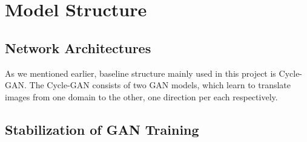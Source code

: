\chapter{Model Structure}\label{Ch:Result}

\section{Network Architectures}

As we mentioned earlier, baseline structure mainly used in this project is Cycle-GAN. The Cycle-GAN consists of two GAN models, which learn to translate images from one domain to the other, one direction per each respectively. 


\section{Stabilization of GAN Training}



\endinput

